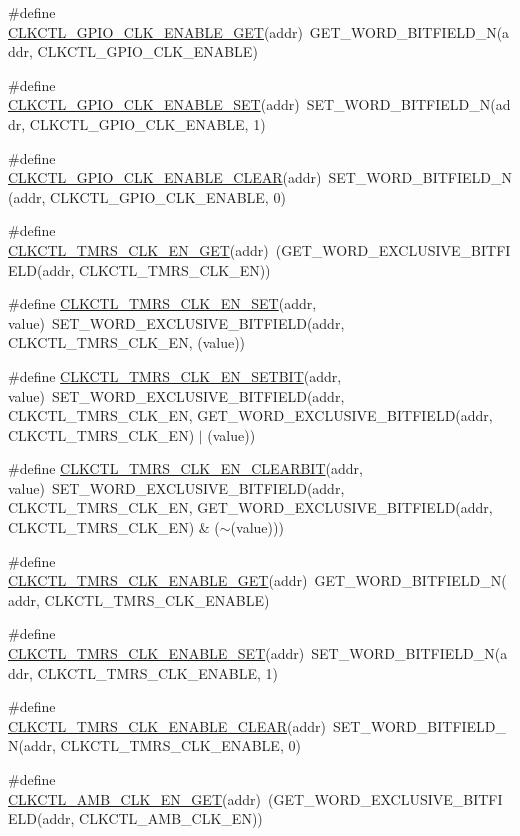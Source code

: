 \begin{DoxyCompactItemize}
\item 
\#define \hyperlink{a00544_aa47793d69111ad83f621ce9e13ea238f}{CLKCTL\_\-GPIO\_\-CLK\_\-ENABLE\_\-GET}(addr)~GET\_\-WORD\_\-BITFIELD\_\-N(addr, CLKCTL\_\-GPIO\_\-CLK\_\-ENABLE)
\item 
\#define \hyperlink{a00544_aef14cae17652cd8e34334cd66c4f30ab}{CLKCTL\_\-GPIO\_\-CLK\_\-ENABLE\_\-SET}(addr)~SET\_\-WORD\_\-BITFIELD\_\-N(addr, CLKCTL\_\-GPIO\_\-CLK\_\-ENABLE, 1)
\item 
\#define \hyperlink{a00544_a0e5da93caa04cfce2b8b24726bc6e4ff}{CLKCTL\_\-GPIO\_\-CLK\_\-ENABLE\_\-CLEAR}(addr)~SET\_\-WORD\_\-BITFIELD\_\-N(addr, CLKCTL\_\-GPIO\_\-CLK\_\-ENABLE, 0)
\item 
\#define \hyperlink{a00544_acd1f562b2d0010a4919d00b82359718e}{CLKCTL\_\-TMRS\_\-CLK\_\-EN\_\-GET}(addr)~(GET\_\-WORD\_\-EXCLUSIVE\_\-BITFIELD(addr, CLKCTL\_\-TMRS\_\-CLK\_\-EN))
\item 
\#define \hyperlink{a00544_a7f51a69f375d3c00c48e0bb0ec7de258}{CLKCTL\_\-TMRS\_\-CLK\_\-EN\_\-SET}(addr, value)~SET\_\-WORD\_\-EXCLUSIVE\_\-BITFIELD(addr, CLKCTL\_\-TMRS\_\-CLK\_\-EN, (value))
\item 
\#define \hyperlink{a00544_a2beaa11a977b8e29a16e6aaa1ffab9fd}{CLKCTL\_\-TMRS\_\-CLK\_\-EN\_\-SETBIT}(addr, value)~SET\_\-WORD\_\-EXCLUSIVE\_\-BITFIELD(addr, CLKCTL\_\-TMRS\_\-CLK\_\-EN, GET\_\-WORD\_\-EXCLUSIVE\_\-BITFIELD(addr, CLKCTL\_\-TMRS\_\-CLK\_\-EN) $|$ (value))
\item 
\#define \hyperlink{a00544_a83d563106804574e01ce8f249b24ddd1}{CLKCTL\_\-TMRS\_\-CLK\_\-EN\_\-CLEARBIT}(addr, value)~SET\_\-WORD\_\-EXCLUSIVE\_\-BITFIELD(addr, CLKCTL\_\-TMRS\_\-CLK\_\-EN, GET\_\-WORD\_\-EXCLUSIVE\_\-BITFIELD(addr, CLKCTL\_\-TMRS\_\-CLK\_\-EN) \& ($\sim$(value)))
\item 
\#define \hyperlink{a00544_a6a6c593b2a5aeea0210bb2179b233c81}{CLKCTL\_\-TMRS\_\-CLK\_\-ENABLE\_\-GET}(addr)~GET\_\-WORD\_\-BITFIELD\_\-N(addr, CLKCTL\_\-TMRS\_\-CLK\_\-ENABLE)
\item 
\#define \hyperlink{a00544_a72eb5a0957ae1ce9578e19ace493b60b}{CLKCTL\_\-TMRS\_\-CLK\_\-ENABLE\_\-SET}(addr)~SET\_\-WORD\_\-BITFIELD\_\-N(addr, CLKCTL\_\-TMRS\_\-CLK\_\-ENABLE, 1)
\item 
\#define \hyperlink{a00544_a7cfb648183fdf9eec570c4b46e163b05}{CLKCTL\_\-TMRS\_\-CLK\_\-ENABLE\_\-CLEAR}(addr)~SET\_\-WORD\_\-BITFIELD\_\-N(addr, CLKCTL\_\-TMRS\_\-CLK\_\-ENABLE, 0)
\item 
\#define \hyperlink{a00544_a11fdd25b76de2f612c9f343016259896}{CLKCTL\_\-AMB\_\-CLK\_\-EN\_\-GET}(addr)~(GET\_\-WORD\_\-EXCLUSIVE\_\-BITFIELD(addr, CLKCTL\_\-AMB\_\-CLK\_\-EN))

\end{DoxyCompactItemize}
